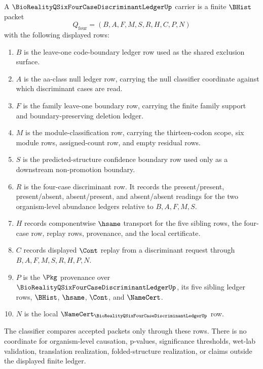 \begin{definition}
\label{def:bioreality-q-six-four-case-discriminant-ledger-carrier}
A $\BioRealityQSixFourCaseDiscriminantLedgerUp$ carrier is a finite $\BHist$ packet
$$
Q_{\mathrm{four}}=(B,A,F,M,S,R,H,C,P,N)
$$
with the following displayed rows:
\begin{enumerate}
\item $B$ is the leave-one code-boundary ledger row used as the shared exclusion surface.
\item $A$ is the aa-class null ledger row, carrying the null classifier coordinate against which discriminant cases are read.
\item $F$ is the family leave-one boundary row, carrying the finite family support and boundary-preserving deletion ledger.
\item $M$ is the module-classification row, carrying the thirteen-codon scope, six module rows, assigned-count row, and empty residual rows.
\item $S$ is the predicted-structure confidence boundary row used only as a downstream non-promotion boundary.
\item $R$ is the four-case discriminant row. It records the present/present, present/absent, absent/present, and absent/absent readings for the two organism-level abundance ledgers relative to $B,A,F,M,S$.
\item $H$ records componentwise $\hsame$ transport for the five sibling rows, the four-case row, replay rows, provenance, and the local certificate.
\item $C$ records displayed $\Cont$ replay from a discriminant request through $B,A,F,M,S,R,H,P,N$.
\item $P$ is the $\Pkg$ provenance over $\BioRealityQSixFourCaseDiscriminantLedgerUp$, its five sibling ledger rows, $\BHist$, $\hsame$, $\Cont$, and $\NameCert$.
\item $N$ is the local $\NameCert_{\BioRealityQSixFourCaseDiscriminantLedgerUp}$ row.
\end{enumerate}
The classifier compares accepted packets only through these rows. There is no coordinate for organism-level causation, p-values, significance thresholds, wet-lab validation, translation realization, folded-structure realization, or claims outside the displayed finite ledger.
\end{definition}

